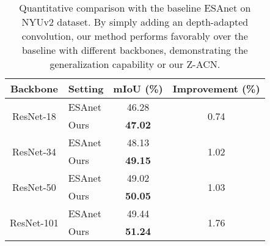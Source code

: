 \documentclass[lettersize,journal]{IEEEtran}
\begin{document}
\begin{table}[t]
\centering
\setlength\tabcolsep{8pt}
\setlength\extrarowheight{0pt}
\caption{Quantitative comparison with the baseline ESAnet on NYUv2 dataset. By simply adding an depth-adapted convolution, our method performs favorably over the baseline with different backbones, demonstrating the generalization capability or our Z-ACN.}
\begin{tabular}[ht]{c |l | c| c }
\hline

\hline
Backbone & Setting   & mIoU (\%)  & Improvement  (\%) \\
\hline
\multirow{2}{*}{ResNet-18}
& ESAnet& 46.28 & \multirow{2}{*}{0.74}\\
& Ours &\textbf{47.02} \\

\hline
\multirow{2}{*}{ResNet-34}
& ESAnet& 48.13& \multirow{2}{*}{1.02}\\
& Ours &\textbf{49.15}\\

\hline
\multirow{2}{*}{ResNet-50}
& ESAnet& 49.02&\multirow{2}{*}{1.03}\\
& Ours &\textbf{50.05}\\

\hline
\multirow{2}{*}{ResNet-101}
& ESAnet & 49.44& \multirow{2}{*}{1.76}\\
& Ours &\textbf{51.24}\\

\hline

\hline

\hline
\end{tabular}

\label{esaresnet}
\end{table}
\end{document}
